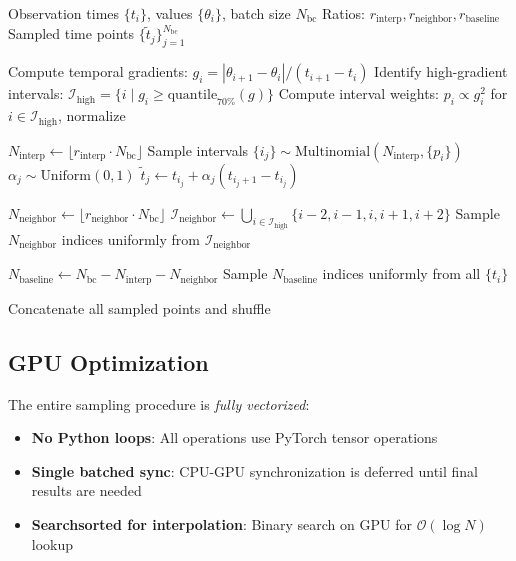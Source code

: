 \documentclass[11pt,a4paper]{article}
\begin{document}
\begin{algorithm}
\caption{Gradient-Based Boundary Condition Sampling}
\begin{algorithmic}
\REQUIRE Observation times $\{t_i\}$, values $\{\theta_i\}$, batch size $N_{\text{bc}}$
\REQUIRE Ratios: $r_{\text{interp}}, r_{\text{neighbor}}, r_{\text{baseline}}$
\ENSURE Sampled time points $\{\tilde{t}_j\}_{j=1}^{N_{\text{bc}}}$

\STATE Compute temporal gradients: $g_i = |\theta_{i+1} - \theta_i| / (t_{i+1} - t_i)$
\STATE Identify high-gradient intervals: $\mathcal{I}_{\text{high}} = \{i \mid g_i \geq \text{quantile}_{70\%}(g)\}$
\STATE Compute interval weights: $p_i \propto g_i^2$ for $i \in \mathcal{I}_{\text{high}}$, normalize

\STATE $N_{\text{interp}} \leftarrow \lfloor r_{\text{interp}} \cdot N_{\text{bc}} \rfloor$
\STATE Sample intervals $\{i_j\} \sim \text{Multinomial}(N_{\text{interp}}, \{p_i\})$
    \STATE $\alpha_j \sim \text{Uniform}(0, 1)$
    \STATE $\tilde{t}_j \leftarrow t_{i_j} + \alpha_j (t_{i_j+1} - t_{i_j})$
\ENDFOR

\STATE $N_{\text{neighbor}} \leftarrow \lfloor r_{\text{neighbor}} \cdot N_{\text{bc}} \rfloor$
\STATE $\mathcal{I}_{\text{neighbor}} \leftarrow \bigcup_{i \in \mathcal{I}_{\text{high}}} \{i-2, i-1, i, i+1, i+2\}$
\STATE Sample $N_{\text{neighbor}}$ indices uniformly from $\mathcal{I}_{\text{neighbor}}$

\STATE $N_{\text{baseline}} \leftarrow N_{\text{bc}} - N_{\text{interp}} - N_{\text{neighbor}}$
\STATE Sample $N_{\text{baseline}}$ indices uniformly from all $\{t_i\}$

\RETURN Concatenate all sampled points and shuffle
\end{algorithmic}
\end{algorithm}

\subsection{GPU Optimization}

The entire sampling procedure is \textit{fully vectorized}:
\begin{itemize}
    \item \textbf{No Python loops}: All operations use PyTorch tensor operations
    \item \textbf{Single batched sync}: CPU-GPU synchronization is deferred until final results are needed
    \item \textbf{Searchsorted for interpolation}: Binary search on GPU for $\mathcal{O}(\log N)$ lookup
\end{itemize}
\end{document}
